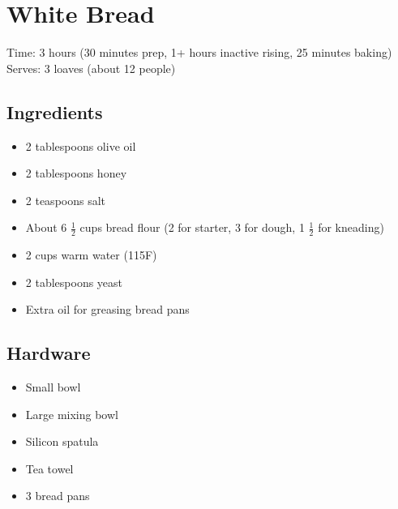 \section{White Bread}
\label{whiteBread}
\setcounter{secnumdepth}{0}
Time: 3 hours (30 minutes prep, 1+ hours inactive rising, 25 minutes baking)
Serves: 3 loaves (about 12 people)

\begin{multicols}{2}
\subsection*{Ingredients}
\begin{itemize}
    \item 2 tablespoons olive oil
    \item 2 tablespoons honey
    \item 2 teaspoons salt
    \item About 6 \( \frac{1}{2} \) cups bread flour (2 for starter, 3 for dough, 1 \( \frac{1}{2} \) for kneading)
    \item 2 cups warm water (115F)
    \item 2 tablespoons yeast
    \item Extra oil for greasing bread pans
\end{itemize}

\subsection*{Hardware}
\begin{itemize}
    \item Small bowl
    \item Large mixing bowl
    \item Silicon spatula
    \item Tea towel
    \item 3 bread pans
\end{itemize}
\clearpage


\end{multicols}
